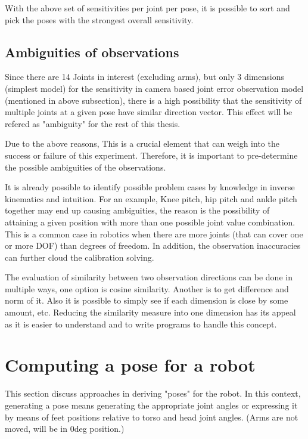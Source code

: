 \documentclass[english, printversion, nomenclature, notitle]{tuvisionthesis} %
\begin{document}
With the above set of sensitivities per joint per pose, it is possible to sort and pick the poses with the strongest overall sensitivity.

\subsection{Ambiguities of observations}

Since there are 14 Joints in interest (excluding arms), but only 3 dimensions (simplest model) for the sensitivity in camera based joint error observation model (mentioned in above subsection), there is a high possibility that the sensitivity of multiple joints at a given pose have similar direction vector. This effect will be refered as "ambiguity" for the rest of this thesis.
 
Due to the above reasons, This is a crucial element that can weigh into the success or failure of this experiment. Therefore, it is important to pre-determine the possible ambiguities of the observations. 

It is already possible to identify possible problem cases by knowledge in inverse kinematics and intuition. For an example, Knee pitch, hip pitch and ankle pitch together may end up causing ambiguities, the reason is the possibility of attaining a given position with more than one possible joint value combination. This is a common case in robotics when there are more joints (that can cover one or more DOF) than degrees of freedom. In addition, the observation inaccuracies can further cloud the calibration solving.

The evaluation of similarity between two observation directions can be done in multiple ways, one option is cosine similarity. Another is to get difference and norm of it. Also it is possible to simply see if each dimension is close by some amount, etc. Reducing the similarity measure into one dimension has its appeal as it is easier to understand and to write programs to handle this concept.


\section{Computing a pose for a robot}
This section discuss approaches in deriving "poses" for the robot. In this context, generating a pose means generating the appropriate joint angles or expressing it by means of feet positions relative to torso and head joint angles. (Arms are not moved, will be in 0deg position.)
\end{document}

